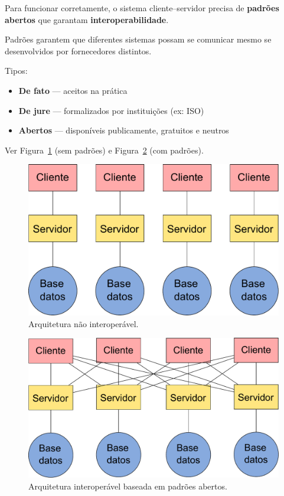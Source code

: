 Para funcionar corretamente, o sistema cliente–servidor precisa de \textbf{padrões abertos} que garantam \textbf{interoperabilidade}.

Padrões garantem que diferentes sistemas possam se comunicar mesmo se desenvolvidos por fornecedores distintos.

Tipos:

\begin{itemize}
 \item \textbf{De fato} — aceitos na prática
 \item \textbf{De jure} — formalizados por instituições (ex: ISO)
 \item \textbf{Abertos} — disponíveis publicamente, gratuitos e neutros
\end{itemize}

Ver Figura~\ref{Fig:Esquema_no_interoperable} (sem padrões) e Figura~\ref{Fig:Esquema_interoperable} (com padrões).

\begin{figure}[!hbt]   
\centering
\includegraphics[width=.7\columnwidth]{Software/Esquema_no_interoperable.pdf}
\caption{\small Arquitetura não interoperável.}
\label{Fig:Esquema_no_interoperable} 
\end{figure}

\begin{figure}[!hbt]   
\centering
\includegraphics[width=.7\columnwidth]{Software/Esquema_interoperable.pdf}
\caption{\small Arquitetura interoperável baseada em padrões abertos.}
\label{Fig:Esquema_interoperable} 
\end{figure}

